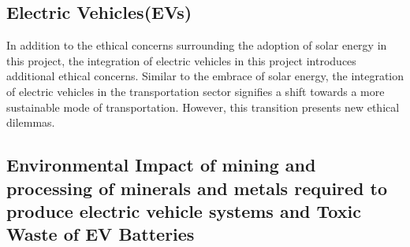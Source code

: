 \documentclass[10pt,twocolumn]{article}
\begin{document}
\subsection{Electric Vehicles(EVs)}
In addition to the ethical concerns surrounding the adoption of solar energy in this project, the integration of electric vehicles in this project introduces additional ethical concerns. Similar to the embrace of solar energy, the integration of electric vehicles in the transportation sector signifies a shift towards a more sustainable mode of transportation. However, this transition presents new ethical dilemmas.   
\subsection{Environmental Impact of mining and processing of minerals and metals required to produce electric vehicle systems and Toxic Waste of EV Batteries }
\end{document}
